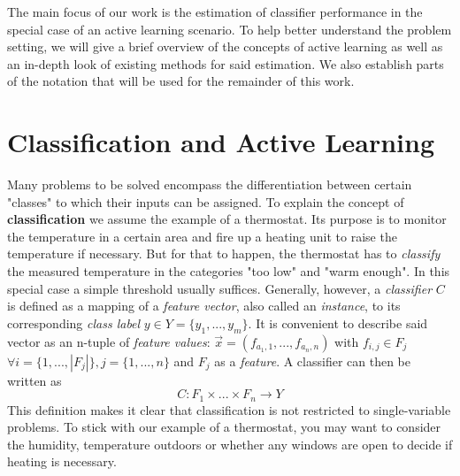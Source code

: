 \label{background}


The main focus of our work is the estimation of classifier performance in the special case of an active learning scenario. To help better understand the problem setting, we will give a brief overview of the concepts of active learning as well as an in-depth look of existing methods for said estimation. We also establish parts of the notation that will be used for the remainder of this work.

\section{Classification and Active Learning}
Many problems to be solved encompass the differentiation between certain "classes" to which their inputs can be assigned. To explain the concept of \textbf{classification} we assume the example of a thermostat. Its purpose is to monitor the temperature in a certain area and fire up a heating unit to raise the temperature if necessary. But for that to happen, the thermostat has to \textit{classify} the measured temperature in the categories "too low" and "warm enough". In this special case a simple threshold usually suffices. Generally, however, a \textit{classifier} $C$ is defined as a mapping of a \textit{feature vector}, also called an \textit{instance}, to its corresponding \textit{class label} $y \in Y = \{y_1, ..., y_m\}$. It is convenient to describe said vector as an n-tuple of \textit{feature values}: $\vec{x} = (f_{a_1,1}, ..., f_{a_n, n})$ with $f_{i,j} \in F_j$ $\forall i = \{1, ..., |F_j|\}, j = \{1, ..., n\}$ and $F_j$ as a \textit{feature}. A classifier can then be written as
\begin{equation}
C: F_1 \times ... \times F_n \rightarrow Y
\end{equation}
\cite{RodriguezEtAl2013}
This definition makes it clear that classification is not restricted to single-variable problems. To stick with our example of a thermostat, you may want to consider the humidity, temperature outdoors or whether any windows are open to decide if heating is necessary.

